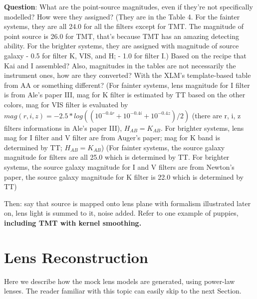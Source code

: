 \documentclass[a4paper,11pt]{article}
\begin{document}
\textbf{Question}: What are the point-source magnitudes, even if they're not specifically modelled? How were they assigned? (They are in the Table 4. For the fainter systems, they are all 24.0 for all the filters except for TMT. The magnitude of point source is 26.0 for TMT, that's because TMT has an amazing detecting ability. For the brighter systems, they are assigned with magnitude of source galaxy - 0.5 for filter K, VIS, and H; - 1.0 for filter I.)
 Based on the recipe that Kai and I assembled? Also, magnitudes in the tables are not necessarily the instrument ones, how are they converted? With the XLM's template-based table from AA or something different? (For fainter systems, lens magnitude for I filter is from Ale's paper III, mag for K filter is estimated by TT based on the other colors, mag for VIS filter is evaluated by $mag(r,i,z)=-2.5*log((10^{-0.4r}+10^{-0.4i}+10^{-0.4z})/2)$ (there are r, i, z filters informations in Ale's paper III), $H_{AB}=K_{AB}$. For brighter systems, lens mag for I filter and V filter are from Auger's paper; mag for K band is determined by TT;  $H_{AB}=K_{AB}$) (For fainter systems, the source galaxy magnitude for filters are all 25.0 which is determined by TT. For brighter systems, the source galaxy magnitude for I and V filters are from Newton's paper, the source galaxy magnitude for K filter is 22.0 which is determined by TT)

Then: say that source is mapped onto lens plane with formalism illustrated later on, lens light is summed to it, noise added. Refer to one example of puppies, \textbf{including TMT with kernel smoothing.}

\section{Lens Reconstruction}
Here we describe how the mock lens models are generated, using power-law lenses. The reader familiar with this topic can easily skip to the next Section.
\end{document}
